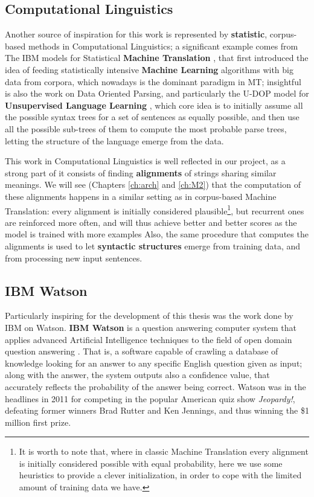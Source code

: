 \subsection{Computational Linguistics}
Another source of inspiration for this work is represented by \textbf{statistic}, corpus-based methods in Computational Linguistics; a significant example comes from The IBM models for Statistical \textbf{Machine Translation} \citep{Brown:1993:MSM:972470.972474}, that first introduced the idea of feeding statistically intensive \textbf{Machine Learning} algorithms with big data from corpora, which nowadays is the dominant paradigm in MT; insightful is also the work on Data Oriented Parsing, and particularly the U-DOP model for \textbf{Unsupervised Language Learning} \citep{Bod:2006:UPU:1596276.1596293}, which core idea is to initially assume all the possible syntax trees for a set of sentences as equally possible, and then use all the possible sub-trees of them to compute the most probable parse trees, letting the structure of the language emerge from the data.

This work in Computational Linguistics is well reflected in our project, as a strong part of it consists of finding \textbf{alignments} of strings sharing similar meanings. We will see (Chapters \ref{ch:arch} and \ref{ch:M2}) that the computation of these alignments happens in a similar setting as in corpus-based Machine Translation: every alignment is initially considered plausible\footnote{It is worth to note that, where in classic Machine Translation every alignment is initially considered possible with equal probability, here we use some heuristics to provide a clever initialization, in order to cope with the limited amount of training data we have.}, but recurrent ones are reinforced more often, and will thus achieve better and better scores as the model is trained with more examples Also, the same procedure that computes the alignments is used to let \textbf{syntactic structures} emerge from training data, and from processing new input sentences.

\subsection{IBM Watson}
Particularly inspiring for the development of this thesis was the work done by IBM on Watson. \textbf{IBM Watson} is a question answering computer system that applies advanced Artificial Intelligence techniques to the field of open domain question answering \citep{Ferrucci:2011:IW:2024723.2019525}. That is, a software capable of crawling a database of knowledge looking for an answer to any specific English question given as input; along with the answer, the system outputs also a confidence value, that accurately reflects the probability of the answer being correct. Watson was in the headlines in 2011 for competing in the popular American quiz show \textit{Jeopardy!}, defeating former winners  Brad Rutter and Ken Jennings, and thus winning the \$1 million first prize.

